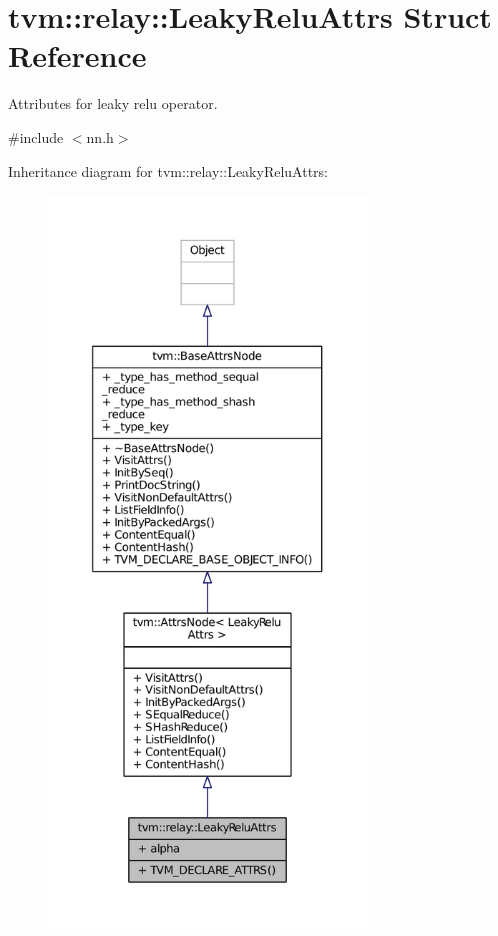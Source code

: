 \hypertarget{structtvm_1_1relay_1_1LeakyReluAttrs}{}\section{tvm\+:\+:relay\+:\+:Leaky\+Relu\+Attrs Struct Reference}
\label{structtvm_1_1relay_1_1LeakyReluAttrs}


Attributes for leaky relu operator.  




{\ttfamily \#include $<$nn.\+h$>$}



Inheritance diagram for tvm\+:\+:relay\+:\+:Leaky\+Relu\+Attrs\+:
\nopagebreak
\begin{figure}[H]
\begin{center}
\leavevmode
\includegraphics[height=550pt]{structtvm_1_1relay_1_1LeakyReluAttrs__inherit__graph}
\end{center}
\end{figure}



